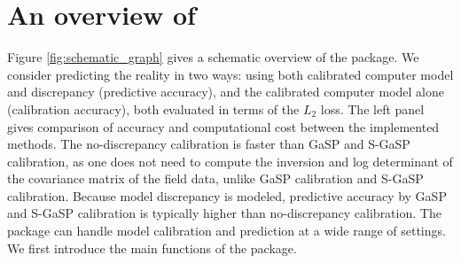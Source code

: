 \section[An overview of \CRANpkg{RobustCalibration}]{An overview of }


  Figure \ref{fig:schematic_graph} gives a schematic overview of the   package. We consider predicting the reality in two ways:  using both calibrated computer model and discrepancy (predictive accuracy), and the calibrated computer model alone (calibration accuracy), both evaluated in terms of the $L_2$ loss. The left panel gives comparison of accuracy and computational cost between the implemented methods. {%
  The no-discrepancy calibration is  faster than GaSP and S-GaSP calibration, as one does not need to compute the inversion and log determinant of the covariance matrix of the field data, unlike GaSP calibration and S-GaSP calibration.} 
    Because model discrepancy is modeled,  predictive accuracy by GaSP and S-GaSP calibration is typically higher than no-discrepancy calibration. The  package can handle model calibration and prediction at a wide range of settings. We first introduce the main functions of the package. 
  
   



